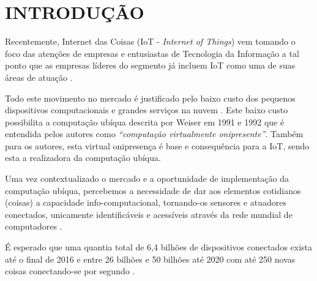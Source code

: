 \chapter[INTRODUÇÃO]{INTRODUÇÃO}

Recentemente, Internet das Coisas (IoT - \textit{Internet of Things}) vem
tomando o foco das atenções de empresas e entusiastas de Tecnologia da
Informação \cite{DzoneIoT:2015} a tal
ponto que as empresas líderes do segmento já incluem IoT como uma de suas áreas
de atuação \cite{Ibm2016} \cite{ARM-mbed} \cite{Microsoft2016} \cite{Intel2016}
\cite{Oracle2016} \cite{Google2016} \cite{AmazonIoT2016}.

Todo este movimento no mercado é justificado pelo baixo custo dos pequenos
dispositivos computacionais \cite{RpiZeroLaunch} \cite{Esp8266.net} e grandes
serviços na nuvem \cite{Kaufmann2015} \cite{Amazon2016}. Este baixo custo
possibilita a computação ubíqua descrita por Weiser em 1991 e 1992
\cite{Weiser1999} que é entendida pelos autores como \textit{``computação
virtualmente onipresente''}. Também para os autores, esta virtual onipresença é
base e consequência para a IoT, sendo esta a realizadora da computação ubíqua.

Uma vez contextualizado o mercado e a oportunidade de implementação da
computação ubíqua, percebemos a necessidade de dar aos elementos cotidianos
(coisas) a capacidade info-computacional, tornando-os sensores e atuadores
conectados, unicamente identificáveis e acessíveis através da rede mundial
de computadores \cite{Lemos2013} \cite{Kranenburg2012}.

É esperado que uma quantia total de 6,4 bilhões de dispositivos conectados
exista até o final de 2016 \cite{GARTNER2015} e entre 26 bilhões
\cite{GARTNER2014} e 50 bilhões até 2020 com até 250 novas coisas conectando-se
por segundo \cite{CiscoBlog2013}.
